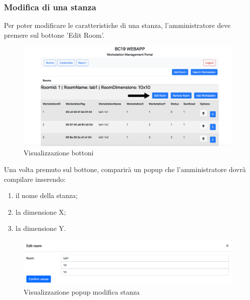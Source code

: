\subsubsection{Modifica di una stanza}
Per poter modificare le caratteristiche di una stanza, l'amministratore deve premere sul bottone 'Edit Room'.
\begin{figure}[H]
	\centering
	\includegraphics[width=15cm]{res/images/bottoneEditRoom.png}
	\caption{Visualizzazione bottoni}
\end{figure}
Una volta premuto sul bottone, comparirà un popup che l'amministratore dovrà compilare inserendo:
\begin{enumerate}
	\item il nome della stanza;
	\item la dimensione X;
	\item la dimensione Y.
\end{enumerate}
\begin{figure}[H]
	\centering
	\includegraphics[width=15cm]{res/images/modificaStanza.png}
	\caption{Visualizzazione popup modifica stanza}
\end{figure}

